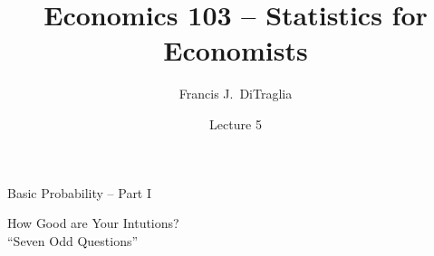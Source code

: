 \documentclass[handout]{beamer}
\title[Econ 103]{Economics 103 -- Statistics for Economists}
\author[F. DiTraglia]{Francis J.\ DiTraglia}
\institute{University of Pennsylvania}
\date{Lecture 5}
\begin{document}
 





\begin{frame}[plain]
	\titlepage 
	

\end{frame} 
\begin{frame}

\begin{center}
 \Huge Basic Probability -- Part I
\end{center}

\end{frame}
\begin{frame}

\centering \Huge How Good are Your Intutions?\\
\normalsize ``Seven Odd Questions'' \href{http://www.amazon.com/An-Introduction-Probability-Inductive-Logic/dp/0521775019/ref=cm_cr_pr_product_top}{}

\end{frame}

\end{document}
